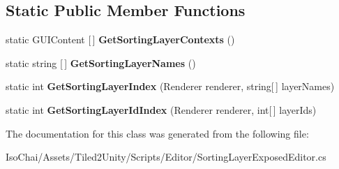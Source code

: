\subsection*{Static Public Member Functions}
\begin{DoxyCompactItemize}
\item 
\mbox{\label{class_sorting_layer_exposed_editor_a3a80907acc6f4ebc060d072af00fda81}} 
static G\+U\+I\+Content \mbox{[}$\,$\mbox{]} {\bfseries Get\+Sorting\+Layer\+Contexts} ()
\item 
\mbox{\label{class_sorting_layer_exposed_editor_a5fe8e0af24db48e01353b98ed02a3768}} 
static string \mbox{[}$\,$\mbox{]} {\bfseries Get\+Sorting\+Layer\+Names} ()
\item 
\mbox{\label{class_sorting_layer_exposed_editor_afbc49b8a12d797616c8afda74ed86aac}} 
static int {\bfseries Get\+Sorting\+Layer\+Index} (Renderer renderer, string\mbox{[}$\,$\mbox{]} layer\+Names)
\item 
\mbox{\label{class_sorting_layer_exposed_editor_a9d280defdaf4d581d17333c339e3e76a}} 
static int {\bfseries Get\+Sorting\+Layer\+Id\+Index} (Renderer renderer, int\mbox{[}$\,$\mbox{]} layer\+Ids)
\end{DoxyCompactItemize}


The documentation for this class was generated from the following file\+:\begin{DoxyCompactItemize}
\item 
Iso\+Chai/\+Assets/\+Tiled2\+Unity/\+Scripts/\+Editor/Sorting\+Layer\+Exposed\+Editor.\+cs\end{DoxyCompactItemize}
